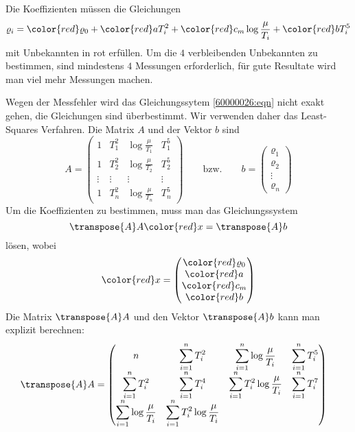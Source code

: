 \begin{loesung}
Die Koeffizienten müssen die Gleichungen
\begin{equation}
\varrho_i
=
{\color{red}\varrho_0}
+
{\color{red}a}T_i^2
+
{\color{red}c_m}\log\frac{\mu}{T_i}
+
{\color{red}b}T_i^5
\label{60000026:eqn}
\end{equation}
mit Unbekannten in {\color{red}rot} erfüllen.
Um die $4$ verbleibenden Unbekannten zu bestimmen, sind mindestens $4$
Messungen erforderlich, für gute Resultate wird man viel mehr Messungen
machen.

Wegen der Messfehler wird das Gleichungssytem \eqref{60000026:eqn}
nicht exakt gehen, die Gleichungen sind überbestimmt.
Wir verwenden daher das Least-Squares Verfahren.
Die Matrix $A$ und der Vektor $b$ sind
\[
A=
\begin{pmatrix}
1 & T_1^2 & \log\frac{\mu}{T_1} & T_1^5 \\
1 & T_2^2 & \log\frac{\mu}{T_2} & T_2^5 \\
\vdots&\vdots&\vdots&\vdots \\
1 & T_n^2 & \log\frac{\mu}{T_n} & T_n^5 
\end{pmatrix}
\qquad
\text{bzw.}
\qquad
b=
\begin{pmatrix}
\varrho_1\\
\varrho_2\\
\vdots\\
\varrho_n
\end{pmatrix}
\]
Um die Koeffizienten zu bestimmen, muss man das Gleichungssystem
\[
\transpose{A}A {\color{red}x} = \transpose{A}b
\]
lösen, wobei 
\[
{\color{red}x}
=
\begin{pmatrix}
{\color{red}\varrho_0}\\
{\color{red}a}\\
{\color{red}c_m}\\
{\color{red}b}
\end{pmatrix}
\]
Die Matrix $\transpose{A}A$ und den Vektor $\transpose{A}b$ kann man explizit berechnen:
\begin{align*}
\transpose{A}A
&=
\begin{pmatrix}
n
	&\displaystyle\sum_{i=1}^n T_i^2
		&\displaystyle\sum_{i=1}^n \log\frac{\mu}{T_i}
			&\displaystyle\sum_{i=1}^n T_i^5
\\
\displaystyle\sum_{i=1}^n T_i^2
	&\displaystyle \sum_{i=1}^n T_i^4
		&\displaystyle \sum_{i=1}^n T_i^2\log\frac{\mu}{T_i}
			&\displaystyle \sum_{i=1}^n T_i^7
\\
\displaystyle\sum_{i=1}^n \log\frac{\mu}{T_i}
	&\displaystyle \sum_{i=1}^n T_i^2\log\frac{\mu}{T_i}

\end{pmatrix}
\end{align*}
\end{loesung}
